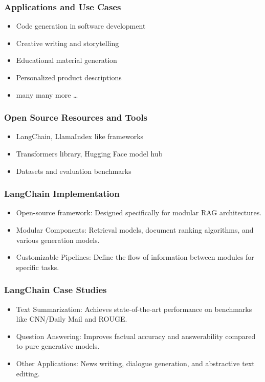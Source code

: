 \begin{frame}[fragile]\frametitle{Applications and Use Cases}

\begin{itemize}
\item Code generation in software development
\item Creative writing and storytelling
\item Educational material generation
\item Personalized product descriptions
\item many many more \ldots
\end{itemize}	

\end{frame}


\begin{frame}[fragile]\frametitle{Open Source Resources and Tools}

\begin{itemize}
\item LangChain, LlamaIndex like frameworks
\item Transformers library, Hugging Face model hub
\item Datasets and evaluation benchmarks
\end{itemize}	

\end{frame}



\begin{frame}[fragile]\frametitle{LangChain Implementation}

\begin{itemize}
\item Open-source framework: Designed specifically for modular RAG architectures.
\item Modular Components: Retrieval models, document ranking algorithms, and various generation models.
\item Customizable Pipelines: Define the flow of information between modules for specific tasks.
\end{itemize}	

\end{frame}

\begin{frame}[fragile]\frametitle{LangChain Case Studies}

\begin{itemize}
\item Text Summarization: Achieves state-of-the-art performance on benchmarks like CNN/Daily Mail and ROUGE.
\item Question Answering: Improves factual accuracy and answerability compared to pure generative models.
\item Other Applications: News writing, dialogue generation, and abstractive text editing.
\end{itemize}	

\end{frame}
